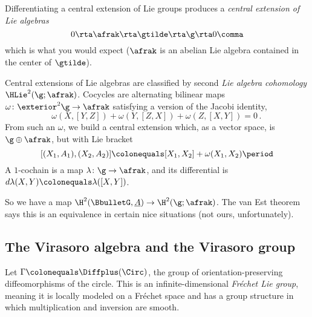 \begin{remark}
\label{cext_lie_alg}
	Differentiating a central extension of Lie groups produces a \emph{central extension of Lie algebras}
	\[
	0\rta	\afrak \rta \gtilde \rta \g \rta 0 \comma 
	\]
	which is what you would expect ($\afrak$ is an abelian Lie algebra contained in the center of
	$\gtilde$).

	Central extensions of Lie algebras are classified by second \emph{Lie algebra cohomology} $\HLie^2(\g;\afrak)$.   
	Cocycles are alternating bilinear maps $\omega\colon\exterior^2\g\to\afrak$ satisfying a version of the Jacobi
	identity,
	\begin{equation}
	\label{LA_cext_Jacobi}
		\omega(X, [Y, Z]) + \omega(Y, [Z, X]) + \omega(Z, [X, Y]) = 0\period
	\end{equation}
	From such an $\omega$, we build a central extension which, as a vector space, is $\g\oplus\afrak$, but with
	Lie bracket
	\begin{equation}
	\label{liealgext}
		[(X_1, A_1), (X_2, A_2)] \colonequals [X_1, X_2] + \omega(X_1, X_2)\period
	\end{equation}
	A $1$-cochain is a map $\lambda\colon\g\to\afrak$, and its differential is $d\lambda(X,
	Y)\colonequals \lambda([X, Y])$.

	So we have a map $\H^2(\BbulletG, \underline A)\to \H^2(\g; \afrak)$. The van Est theorem says this is an
	equivalence in certain nice situations (not ours, unfortunately).
\end{remark}


\subsection{The Virasoro algebra and the Virasoro group}

Let $\Gamma\colonequals \Diffplus(\Circ)$,  
the group of orientation-preserving diffeomorphisms of the circle. This is an
infinite-dimensional \emph{Fréchet Lie group}, meaning it is locally modeled on a Fréchet space and has a group
structure in which multiplication and inversion are smooth.

